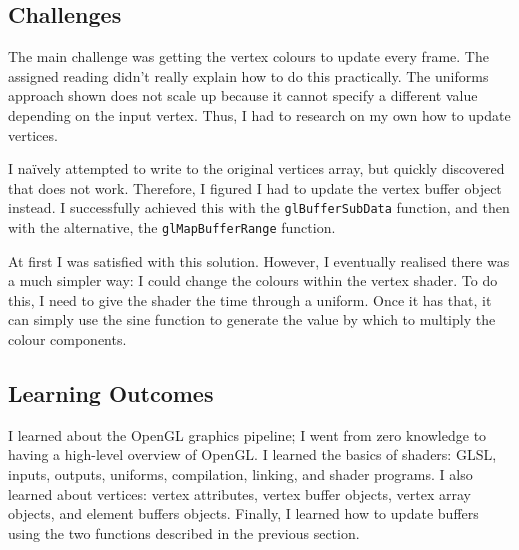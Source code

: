 \documentclass[a4paper, 12pt]{scrartcl}
\begin{document}
\subsection{Challenges}
The main challenge was getting the vertex colours to update every frame. The assigned reading didn't really explain how to do this practically. The uniforms approach shown does not scale up because it cannot specify a different value depending on the input vertex. Thus, I had to research on my own how to update vertices.

I naïvely attempted to write to the original vertices array, but quickly discovered that does not work. Therefore, I figured I had to update the vertex buffer object instead. I successfully achieved this with the \texttt{glBufferSubData} function, and then with the alternative, the \texttt{glMapBufferRange} function.

At first I was satisfied with this solution. However, I eventually realised there was a much simpler way: I could change the colours within the vertex shader. To do this, I need to give the shader the time through a uniform. Once it has that, it can simply use the sine function to generate the value by which to multiply the colour components.

\subsection{Learning Outcomes}
I learned about the OpenGL graphics pipeline; I went from zero knowledge to having a high-level overview of OpenGL. I learned the basics of shaders: GLSL, inputs, outputs, uniforms, compilation, linking, and shader programs. I also learned about vertices: vertex attributes, vertex buffer objects, vertex array objects, and element buffers objects. Finally, I learned how to update buffers using the two functions described in the previous section.
\end{document}
